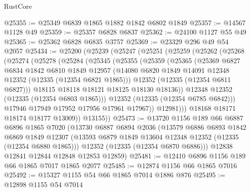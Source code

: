 \begin{lexlean}{RustCore}
\begin{coremodule}
@25355 := @25349 @6839 @1865 @1882 @1842 @6802 @1849
@25357 := @14567 @1128 @49
@25359 := @25357 @6828 @6837
@25362 := @24100 @1127 @55 @49
@25365 := @25362 @6828 @6835 @3757
@25369 := @23329 @296 @49 @54 @2057
@25434 := @25200
    (@25239
      (@25247
        (@25251
          (@25259
            (@25262
              (@25268
                (@25274
                  (@25278
                    (@25284
                      (@25345
                        (@25355
                          (@25359
                            (@25365
                              (@25369
                                @6827
                                @6834
                                @1842
                                @6810
                                @1849
                                @12957
                                (@14080
                                  @6820
                                  @1849
                                  @14091
                                  @12348
                                  @12352
                                  (@12335 (@12354 @6821 @1865)))
                                @12352
                                (@12335 (@12354 @6811 @6827)))
                              @18115
                              @18118
                              @18121
                              @18125
                              @18130
                              @18136))
                          @12348
                          @12352
                          (@12335 (@12354 @6803 @1865)))
                        @12352
                        (@12335 (@12354 @6785 @6842)))
                      @17946
                      @17949
                      @17952
                      @17956
                      @17961
                      @17967))
                  @12981)))
            @18168
            @18171
            @18174
            @18177
            @13009))
        @13155))
@25473 := @13720
    @1156
    @189
    @66
    @6887
    @6896
    @1865
    @7020
    (@13730
      @6887
      @6894
      @2036
      (@13579
        @6886
        @6893
        @1842
        @6869
        @1849
        @12307
        (@13593 @6879 @1849 @13604 @12348 @12352 (@12335 (@12354 @6880 @1865)))
        @12352
        (@12335 (@12354 @6870 @6886)))
      @12838
      @12841
      @12844
      @12848
      @12853
      @12859)
@25481 := @12410 @6896 @1156 @189 @66 @1865 @7017 @1865 @2077
@25485 := @12874 @1156 @66 @1865 @7016
@25492 := @15327 @1155 @54 @66 @1865 @7014 @1886 @876
@25495 := @12898 @1155 @54 @7014

\end{coremodule}
\end{lexlean}
